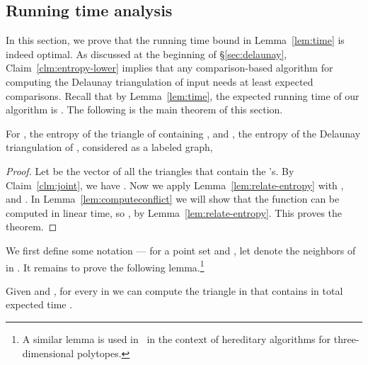 \documentclass{siamltex}
\begin{document}
\subsection{Running time analysis}\label{sec:running-time}

In this section, we prove that the running time bound
in Lemma~\ref{lem:time} is indeed optimal. As discussed 
at the beginning of \S\ref{sec:delaunay}, 
Claim~\ref{clm:entropy-lower} implies that any
comparison-based algorithm for computing the Delaunay
triangulation of input  needs at least
 expected comparisons.
Recall that by Lemma~\ref{lem:time}, the expected running time 
of our algorithm is 
.
The following is the main theorem of this section.
\medskip
\begin{theorem} \label{thm:main-entropy}
For , the
entropy of the triangle  of  containing ,
and , the entropy of the Delaunay triangulation of ,
considered as a labeled graph, 

\end{theorem}

\begin{proof}
Let  be 
the vector of all 
the triangles that contain the 's. By Claim~\ref{clm:joint}, we have
. Now we apply 
Lemma~\ref{lem:relate-entropy} with
,  
and . In Lemma~\ref{lem:computeconflict} we will show
that the function  
can be computed
in linear time, so , by 
Lemma~\ref{lem:relate-entropy}. 
This proves the theorem.
\end{proof}
\medskip

We first define some notation --- for a point set 
 and , 
let  denote the neighbors of  in . It 
remains to prove the following lemma.\footnote{A similar
lemma is used in~\cite{ChazelleMu09} in the context of 
hereditary algorithms for three-dimensional polytopes.}
\medskip

\begin{lemma}\label{lem:computeconflict}
Given  and , for every  in  we can compute the 
triangle  in  that contains  
in total expected time .
\end{lemma}
\end{document}
